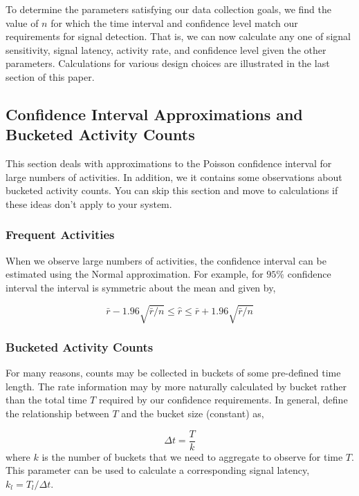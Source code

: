 \documentclass{article}
\begin{document}
To determine the parameters satisfying our data collection goals, we find the value of $n$ for which
the time interval and confidence level match our requirements for signal detection.  That is, we can
now calculate any one of signal sensitivity, signal latency, activity rate, and confidence level given
the other parameters. Calculations for various design choices are illustrated in the last section of this paper.

\subsection{Confidence Interval Approximations and Bucketed Activity Counts}

This section deals with approximations to the Poisson confidence interval for large numbers of activities. In
addition, we it contains some observations about bucketed activity counts. You can skip this section and
move to calculations if these ideas don't apply to your system.

\subsubsection{Frequent Activities} 

When we observe large numbers of activities, the confidence interval can be estimated using the Normal
approximation. For example, for $95\%$ confidence interval the interval is symmetric about the mean
and given by,

\begin{equation}
    \label{eq:largenconf}
    \bar{r} - 1.96 \sqrt{\bar{r}/n} \leq \hat{r} \leq \bar{r} + 1.96 \sqrt{\bar{r}/n}
\end{equation}

\subsubsection{Bucketed Activity Counts}

For many reasons, counts may be collected in buckets of some pre-defined time length.  The rate information
may by more naturally calculated by bucket rather than the total time $T$ required by our confidence
requirements. In general, define the relationship between $T$ and the bucket size (constant) as,

\begin{equation}
    \label{eq:bucket}
    \Delta t = \frac{T}{k}
\end{equation}
where $k$ is the number of buckets that we need to aggregate to observe for time $T$. This parameter
can be used to calculate a corresponding signal latency, $k_l = T_l/\Delta t$.
\end{document}
